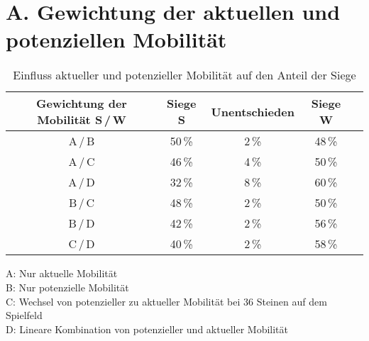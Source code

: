 
\addchap{\langanhang}

\section*{A. Gewichtung der aktuellen und potenziellen Mobilität}
 
\setcounter{table}{0}
\renewcommand{\thetable}{A\arabic{table}}

\begin{table}[hb]
\centering
\begin{tabular}{c|cccc}
\hline
Gewichtung der Mobilität S\,/\,W & Siege S & Unentschieden & Siege W \\
\hline
 A\,/\,B & 50\,\% &  2\,\% & 48\,\% \\
 A\,/\,C & 46\,\% &  4\,\% & 50\,\% \\
 A\,/\,D & 32\,\% &  8\,\% & 60\,\% \\
 B\,/\,C & 48\,\% &  2\,\% & 50\,\% \\
 B\,/\,D & 42\,\% &  2\,\% & 56\,\% \\
 C\,/\,D & 40\,\% &  2\,\% & 58\,\% \\
\hline
\end{tabular}
\caption{Einfluss aktueller und potenzieller Mobilität auf den Anteil der Siege}
\label{table:mobility}
\end{table}

\small{
A: Nur aktuelle Mobilität \\
B: Nur potenzielle Mobilität \\
C: Wechsel von potenzieller zu aktueller Mobilität bei 36 Steinen auf dem Spielfeld \\
D: Lineare Kombination von potenzieller und aktueller Mobilität}

\pagebreak

